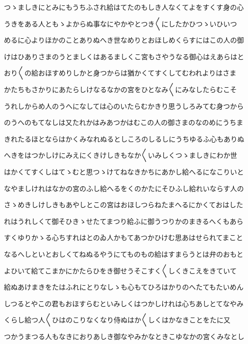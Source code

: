 \documentclass[a4paper,11pt,landscape]{ltjtarticle}
\begin{document}
\par\medskip
つゝましきにとみにもうちふされ給はてたのもしき人なくてよをすくす身の心
\par\medskip
うきをある人ともゝよからぬ事なにやかやとつき〱にしたかひつゝいひいつ
\par\medskip
めるに心よりほかのことありぬへき世なめりとおほしめくらすにはこの人の御
\par\medskip
けはひありさまのうとましくはあるましくこ宮もさやうなる御心はえあらはと
\par\medskip
おり〱の給おほすめりしかと身つからは猶かくてすくしてむわれよりはさま
\par\medskip
かたちもさかりにあたらしけなるなかの宮をひとなみ〱にみなしたらむこそ
\par\medskip
うれしからめ人のうへになしては心のいたらむかきり思うしろみてむ身つから
\par\medskip
のうへのもてなしは又たれかはみあつかはむこの人の御さまのなのめにうちま
\par\medskip
きれたるほとならはかくみなれぬるとしころのしるしにうちゆるふ心もありぬ
\par\medskip
へきをはつかしけにみえにくきけしきもなか〱いみしくつゝましきにわか世
\par\medskip
はかくてすくしはてゝむと思つゝけてねなきかちにあかし給へるになこりいと
\par\medskip
なやましけれはなかの宮のふし給へるをくのかたにそひふし給れいならす人の
\par\medskip
さゝめきしけしきもあやしとこの宮はおほしつらねたまへるにかくておはした
\par\medskip
れはうれしくて御そひきゝせたてまつり給ふに御うつりかのまきるへくもあら
\par\medskip
すくゆりかゝる心ちすれはとのゐ人かもてあつかひけむ思あはせられてまこと
\par\medskip
なるへしといとおしくてねぬるやうにてものもの給はすまらうとは弁のおもと
\par\medskip
よひいて給てこまかにかたらひをき御せうそこすく〱しくきこえをきていて
\par\medskip
給ぬあけまきをたはふれにとりなしゝも心もてひろはかりのへたてもたいめん
\par\medskip
しつるとやこの君もおほすらむといみしくはつかしけれは心ちあしとてなやみ
\par\medskip
くらし給つ人〱ひはのこりなくなり侍ぬはか〱しくはかなきことをたに又
\par\medskip
つかうまつる人もなきにおりあしき御なやみかなときこゆなかの宮くみなとし
\par\medskip
\end{document}
